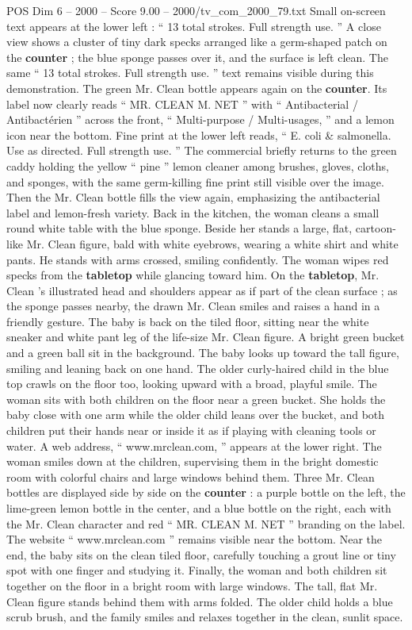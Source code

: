 \begin{textsample}{POS Dim 6 – 2000 – Score 9.00 – 2000/tv\_com\_2000\_79.txt}
Small on-screen text appears at the lower left : “ 13 total strokes.
Full strength use. ” A close view shows a cluster of tiny dark specks arranged like a germ-shaped patch on the \textbf{counter} ; the blue sponge passes over it, and the surface is left clean.
The same “ 13 total strokes.
Full strength use. ” text remains visible during this demonstration.
The green Mr.
Clean bottle appears again on the \textbf{counter}.
Its label now clearly reads “ MR.
CLEAN M.
NET ” with “ Antibacterial / Antibactérien ” across the front, “ Multi-purpose / Multi-usages, ” and a lemon icon near the bottom.
Fine print at the lower left reads, “ E. coli \& salmonella.
Use as directed.
Full strength use. ” The commercial briefly returns to the green caddy holding the yellow “ pine ” lemon cleaner among brushes, gloves, cloths, and sponges, with the same germ-killing fine print still visible over the image.
Then the Mr.
Clean bottle fills the view again, emphasizing the antibacterial label and lemon-fresh variety.
Back in the kitchen, the woman cleans a small round white table with the blue sponge.
Beside her stands a large, flat, cartoon-like Mr.
Clean figure, bald with white eyebrows, wearing a white shirt and white pants.
He stands with arms crossed, smiling confidently.
The woman wipes red specks from the \textbf{tabletop} while glancing toward him.
On the \textbf{tabletop}, Mr.
Clean ’s illustrated head and shoulders appear as if part of the clean surface ; as the sponge passes nearby, the drawn Mr.
Clean smiles and raises a hand in a friendly gesture.
The baby is back on the tiled floor, sitting near the white sneaker and white pant leg of the life-size Mr.
Clean figure.
A bright green bucket and a green ball sit in the background.
The baby looks up toward the tall figure, smiling and leaning back on one hand.
The older curly-haired child in the blue top crawls on the floor too, looking upward with a broad, playful smile.
The woman sits with both children on the floor near a green bucket.
She holds the baby close with one arm while the older child leans over the bucket, and both children put their hands near or inside it as if playing with cleaning tools or water.
A web address, “ www.mrclean.com, ” appears at the lower right.
The woman smiles down at the children, supervising them in the bright domestic room with colorful chairs and large windows behind them.
Three Mr.
Clean bottles are displayed side by side on the \textbf{counter} : a purple bottle on the left, the lime-green lemon bottle in the center, and a blue bottle on the right, each with the Mr.
Clean character and red “ MR.
CLEAN M.
NET ” branding on the label.
The website “ www.mrclean.com ” remains visible near the bottom.
Near the end, the baby sits on the clean tiled floor, carefully touching a grout line or tiny spot with one finger and studying it.
Finally, the woman and both children sit together on the floor in a bright room with large windows.
The tall, flat Mr.
Clean figure stands behind them with arms folded.
The older child holds a blue scrub brush, and the family smiles and relaxes together in the clean, sunlit space.

\end{textsample}
